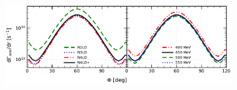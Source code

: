     \begin{figure}[h]
        \begin{center}
        \includegraphics[width=0.9\textwidth]{PlotData/PION/Dalitz_maps/figures/3H_dGdphi.pdf}
        \end{center}
        \caption{}
        \label{pion_dGdphi_3H}
    \end{figure}

